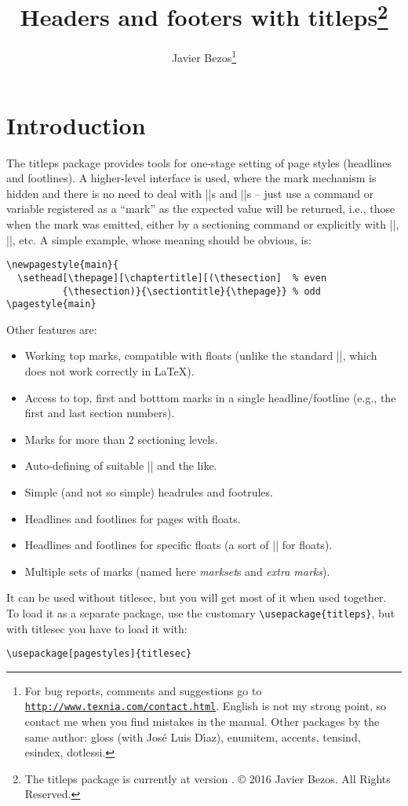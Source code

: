 \documentclass[a4paper]{ltxguide}
\title{Headers and footers with \textsf{titleps}\footnote{The
\textsf{titleps} package is currently at version \fileversion.
\copyright{} 2016 Javier Bezos.  All Rights Reserved.}}
\author{Javier Bezos\footnote{For bug reports, comments and
suggestions go to \href{http://www.texnia.com/contact.html}%
{\texttt{http://www.texnia.com/contact.html}}.  English
is not my strong point, so contact me when you find mistakes in the
manual.  Other packages by the same author: \textsf{gloss} (with
Jos\'e Luis D\'{\i}az), \textsf{enumitem, accents, tensind, esindex,
dotlessi}.}}
\date{\docdate}
\begin{document}
\maketitle
\tableofcontents
\section{Introduction}

The \textsf{titleps} package provides tools for one-stage setting of
page styles (headlines and footlines).  A higher-level interface is
used, where the mark mechanism is hidden and there is no need to deal
with |\leftmark|s and |\rightmark|s -- just use a command or variable
registered as a ``mark'' as the expected value will be returned, i.e.,
those when the mark was emitted, either by a sectioning command or
explicitly with |\chaptermark|, |\sectionmark|, etc.  A simple
example, whose meaning should be obvious, is:
\begin{verbatim}
\newpagestyle{main}{
  \sethead[\thepage][\chaptertitle][(\thesection]  % even
          {\thesection)}{\sectiontitle}{\thepage}} % odd
\pagestyle{main}
\end{verbatim}

Other features are:
\begin{itemize}
\item Working top marks, compatible with floats (unlike the standard 
|\topmark|, which does not work correctly in \LaTeX{}).
\item Access to top, first and botttom marks in a single headline/footline
(e.g., the first and last section numbers).
\item Marks for more than 2 sectioning levels.
\item Auto-defining of suitable |\sectionmark| and the like.
\item Simple (and not so simple) headrules and footrules.
\item Headlines and footlines for pages with floats.
\item Headlines and footlines for specific floats (a sort of 
|\thispagestyle| for floats).
\item Multiple sets of marks (named here \emph{markset}s and 
\textit{extra marks}).
\end{itemize}

It can be used without \textsf{titlesec}, but you will get most of 
it when used together.  To load it as a separate package, use the
customary \verb|\usepackage{titleps}|, but with \textsf{titlesec} you
have to load it with:
\begin{verbatim}
\usepackage[pagestyles]{titlesec}
\end{verbatim}
\end{document}
